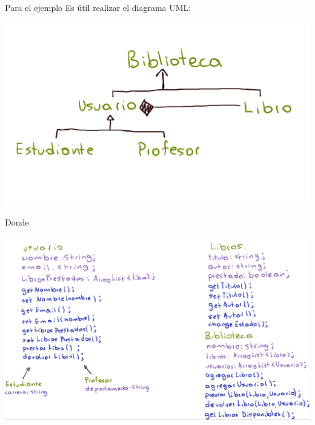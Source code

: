 \documentclass[executivepaper]{article}
\begin{document}
\newpage
Para el ejemplo Es útil realizar el diagrama UML:
\begin{center}
    \includegraphics[scale=0.2]{3.1.png}\\ 
\end{center}
Donde
\begin{center}
    \includegraphics[scale=0.3]{3.2.png}\\ 
\end{center}
\end{document}
